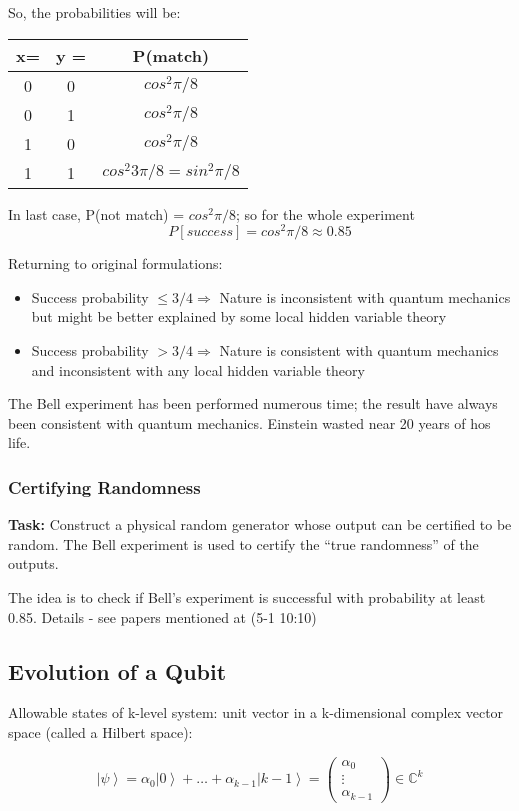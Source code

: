 \documentclass{scrartcl}
\newcommand{\cplx}{\mathbb{C}} %
\newcommand{\ket}[1]{\left| #1 \right>} %
\begin{document}
So, the probabilities will be:
\begin{tabular}{cc|c}
  \textbf{ x=} & \textbf{ y = } & \textbf{P(match)} \\
  \hline
  0 & 0  & $cos^2 \pi/8$ \\
  0 & 1  & $cos^2 \pi/8$ \\
  1 & 0  & $cos^2 \pi/8$ \\
  1 & 1  & $cos^2 3\pi/8 = sin^2 \pi/8$ \\
\end{tabular}

In last case, P(not match) = $cos^2 \pi / 8$; so for the whole experiment
$$P[success] = cos^2 \pi / 8 \approx 0.85$$

Returning to original formulations:
\begin{itemize}
\item Success probability $\leq 3/4 \Rightarrow$ Nature is inconsistent with
  quantum mechanics but might be better explained by some local hidden variable
  theory
\item Success probability $> 3/4 \Rightarrow$ Nature is consistent with quantum
  mechanics and inconsistent with any local hidden variable theory
\end{itemize}
The Bell experiment has been performed numerous time; the result have always
been consistent with quantum mechanics. Einstein wasted near 20 years of hos
life.

\subsubsection{Certifying Randomness}
\label{sec:5-1}

{\bf Task:} Construct a physical random generator whose output can be certified
to be random. The Bell experiment is used to certify the ``true randomness'' of
the outputs.

The idea is to check if Bell's experiment is successful with probability at
least 0.85. Details - see papers mentioned at (5-1 10:10)

\subsection{Evolution of a Qubit}
\label{sec:5-2}

Allowable states of k-level system: unit vector in a k-dimensional complex
vector space (called a Hilbert space):

\[\ket\psi = \alpha_0\ket0 + \dots + \alpha_{k-1}\ket{k-1} =
\begin{pmatrix} \alpha_0 \\ \vdots \\ \alpha_{k-1} \end{pmatrix} \in \cplx^k\]
\end{document}
